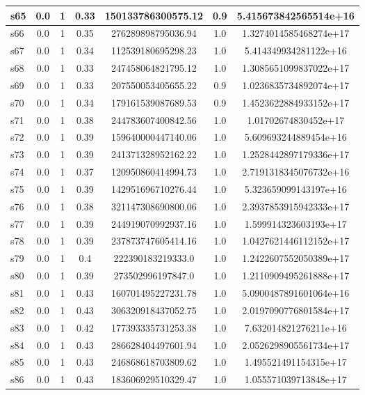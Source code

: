 \documentclass{article}
\begin{document}
\begin{tabular}{|l|c|c|c|c|c|c|}
\hline
s65 &0.0 & 1 & 0.33 & 150133786300575.12 & 0.9 & 5.415673842565514e+16\\
\hline
s66 &0.0 & 1 & 0.35 & 276289898795036.94 & 1.0 & 1.3274014585468274e+17\\
\hline
s67 &0.0 & 1 & 0.34 & 112539180695298.23 & 1.0 & 5.414349934281122e+16\\
\hline
s68 &0.0 & 1 & 0.33 & 247458064821795.12 & 1.0 & 1.3085651099837022e+17\\
\hline
s69 &0.0 & 1 & 0.33 & 207550053405655.22 & 0.9 & 1.0236835734892074e+17\\
\hline
s70 &0.0 & 1 & 0.34 & 179161539087689.53 & 0.9 & 1.4523622884933152e+17\\
\hline
s71 &0.0 & 1 & 0.38 & 244783607400842.56 & 1.0 & 1.01702674830452e+17\\
\hline
s72 &0.0 & 1 & 0.39 & 159640000447140.06 & 1.0 & 5.609693244889454e+16\\
\hline
s73 &0.0 & 1 & 0.39 & 241371328952162.22 & 1.0 & 1.2528442897179336e+17\\
\hline
s74 &0.0 & 1 & 0.37 & 120950860414994.73 & 1.0 & 2.7191318345076732e+16\\
\hline
s75 &0.0 & 1 & 0.39 & 142951696710276.44 & 1.0 & 5.323659099143197e+16\\
\hline
s76 &0.0 & 1 & 0.38 & 321147308690800.06 & 1.0 & 2.3937853915942333e+17\\
\hline
s77 &0.0 & 1 & 0.39 & 244919070992937.16 & 1.0 & 1.599914323603193e+17\\
\hline
s78 &0.0 & 1 & 0.39 & 237873747605414.16 & 1.0 & 1.0427621446112152e+17\\
\hline
s79 &0.0 & 1 & 0.4 & 222390183219333.0 & 1.0 & 1.2422607552050389e+17\\
\hline
s80 &0.0 & 1 & 0.39 & 273502996197847.0 & 1.0 & 1.2110909495261888e+17\\
\hline
s81 &0.0 & 1 & 0.43 & 160701495227231.78 & 1.0 & 5.0900487891601064e+16\\
\hline
s82 &0.0 & 1 & 0.43 & 306320918437052.75 & 1.0 & 2.0197090776801584e+17\\
\hline
s83 &0.0 & 1 & 0.42 & 177393335731253.38 & 1.0 & 7.632014821276211e+16\\
\hline
s84 &0.0 & 1 & 0.43 & 286628404497601.94 & 1.0 & 2.0526298905561734e+17\\
\hline
s85 &0.0 & 1 & 0.43 & 246868618703809.62 & 1.0 & 1.495521491154315e+17\\
\hline
s86 &0.0 & 1 & 0.43 & 183606929510329.47 & 1.0 & 1.055571039713848e+17\\

\end{tabular}
\end{document}
